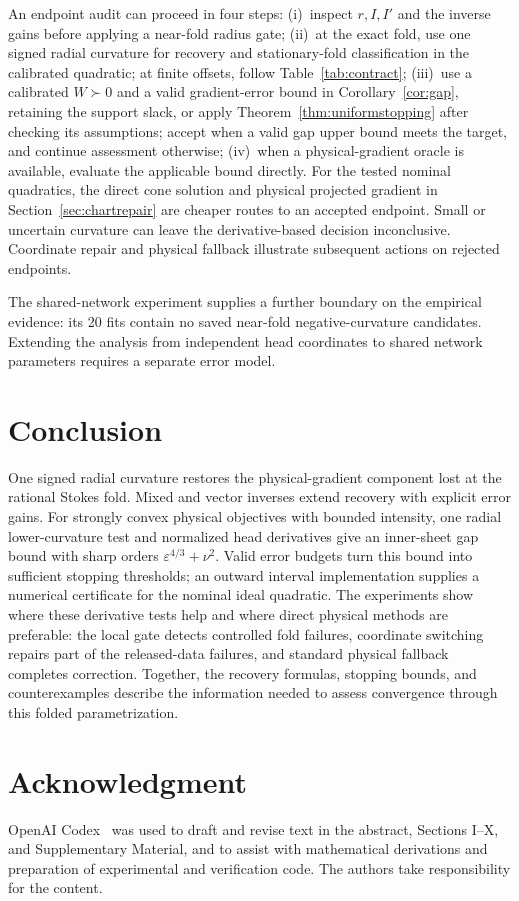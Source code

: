 An endpoint audit can proceed in four steps: (i)~inspect $r,I,I'$ and the inverse gains before applying a near-fold radius gate; (ii)~at the exact fold, use one signed radial curvature for recovery and stationary-fold classification in the calibrated quadratic; at finite offsets, follow Table~\ref{tab:contract}; (iii)~use a calibrated $W\succ0$ and a valid gradient-error bound in Corollary~\ref{cor:gap}, retaining the support slack, or apply Theorem~\ref{thm:uniformstopping} after checking its assumptions; accept when a valid gap upper bound meets the target, and continue assessment otherwise; (iv)~when a physical-gradient oracle is available, evaluate the applicable bound directly. For the tested nominal quadratics, the direct cone solution and physical projected gradient in Section~\ref{sec:chartrepair} are cheaper routes to an accepted endpoint. Small or uncertain curvature can leave the derivative-based decision inconclusive. Coordinate repair and physical fallback illustrate subsequent actions on rejected endpoints.

The shared-network experiment supplies a further boundary on the empirical evidence: its 20 fits contain no saved near-fold negative-curvature candidates. Extending the analysis from independent head coordinates to shared network parameters requires a separate error model.

\section{Conclusion}
One signed radial curvature restores the physical-gradient component lost at the rational Stokes fold. Mixed and vector inverses extend recovery with explicit error gains. For strongly convex physical objectives with bounded intensity, one radial lower-curvature test and normalized head derivatives give an inner-sheet gap bound with sharp orders $\varepsilon^{4/3}+\nu^2$. Valid error budgets turn this bound into sufficient stopping thresholds; an outward interval implementation supplies a numerical certificate for the nominal ideal quadratic. The experiments show where these derivative tests help and where direct physical methods are preferable: the local gate detects controlled fold failures, coordinate switching repairs part of the released-data failures, and standard physical fallback completes correction. Together, the recovery formulas, stopping bounds, and counterexamples describe the information needed to assess convergence through this folded parametrization.

\section*{Acknowledgment}
OpenAI Codex~\cite{codex} was used to draft and revise text in the abstract, Sections I--X, and Supplementary Material, and to assist with mathematical derivations and preparation of experimental and verification code. The authors take responsibility for the content.

